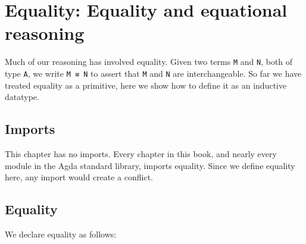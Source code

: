 \hypertarget{Equality}{%
\chapter{Equality: Equality and equational reasoning}\label{Equality}}

\begin{fence}
\begin{code}%
\>[0]\AgdaSpace{}%
\AgdaSpace{}%
\<%
\end{code}
\end{fence}

Much of our reasoning has involved equality. Given two terms \texttt{M}
and \texttt{N}, both of type \texttt{A}, we write \texttt{M\ ≡\ N} to
assert that \texttt{M} and \texttt{N} are interchangeable. So far we
have treated equality as a primitive, here we show how to define it as
an inductive datatype.

\hypertarget{imports}{%
\section{Imports}\label{imports}}

This chapter has no imports. Every chapter in this book, and nearly
every module in the Agda standard library, imports equality. Since we
define equality here, any import would create a conflict.

\hypertarget{equality}{%
\section{Equality}\label{equality}}

We declare equality as follows:

\begin{fence}
\begin{code}%
\>[0]\AgdaSpace{}%
\AgdaSpace{}%
\AgdaSymbol{\{}\AgdaSpace{}%
\AgdaSymbol{:}\AgdaSpace{}%
\AgdaSymbol{\}}\AgdaSpace{}%
\AgdaSymbol{(}\AgdaSpace{}%
\AgdaSymbol{:}\AgdaSpace{}%
\AgdaSymbol{)}\AgdaSpace{}%
\AgdaSymbol{:}\AgdaSpace{}%
\AgdaSpace{}%
\AgdaSpace{}%
\AgdaSpace{}%
\<%
\\
\>[0][@{}l@{\AgdaIndent{0}}]%
\>[2]\AgdaSpace{}%
\AgdaSymbol{:}\AgdaSpace{}%
\AgdaSpace{}%
\AgdaSpace{}%
\<%
\end{code}
\end{fence}

